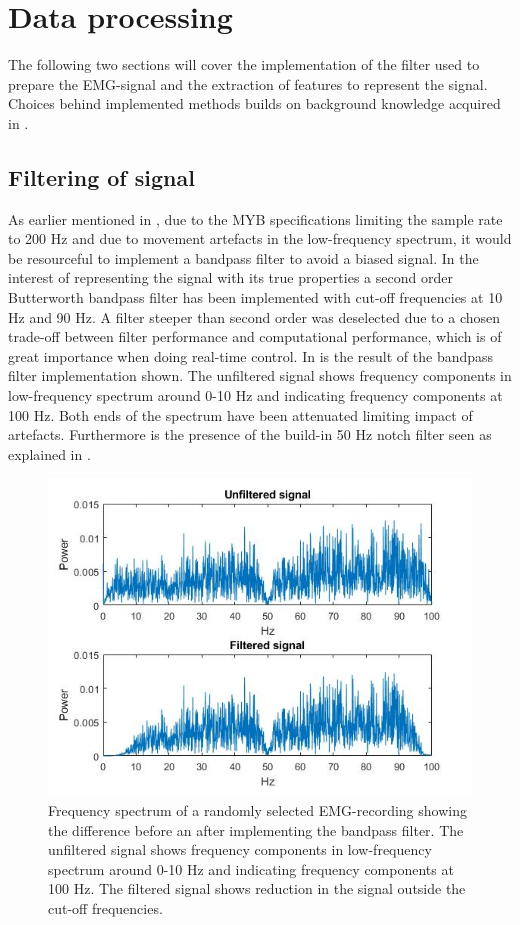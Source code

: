 

\section{Data processing} \label{sec:M:dataProcessing}

The following two sections will cover the implementation of the filter used to prepare the EMG-signal and the extraction of features to represent the signal. Choices behind implemented methods builds on background knowledge acquired in . 

\subsection{Filtering of signal} \label{sub:M:filtering} 

As earlier mentioned in , due to the MYB specifications limiting the sample rate to 200 Hz and due to movement artefacts in the low-frequency spectrum, it would be resourceful to implement a bandpass filter to avoid a biased signal.
In the interest of representing the signal with its true properties a second order Butterworth bandpass filter has been implemented with cut-off frequencies at 10 Hz and 90 Hz. A filter steeper than second order was deselected due to a chosen trade-off between filter performance and computational performance, which is of great importance when doing real-time control. In  is the result of the bandpass filter implementation shown. The unfiltered signal shows frequency components in low-frequency spectrum around 0-10 Hz and indicating frequency components at 100 Hz. Both ends of the spectrum have been attenuated limiting impact of artefacts. Furthermore is the presence of the build-in 50 Hz notch filter seen as explained in .     


\begin{figure}[H]                 
\includegraphics[width=.8\textwidth]{figures/pMethods/Filt}  
\caption{Frequency spectrum of a randomly selected EMG-recording showing the difference before an after implementing the bandpass filter. The unfiltered signal shows frequency components in low-frequency spectrum around 0-10 Hz and indicating frequency components at 100 Hz. The filtered signal shows reduction in the signal outside the cut-off frequencies.}
\label{fig:filt} 
\end{figure}

